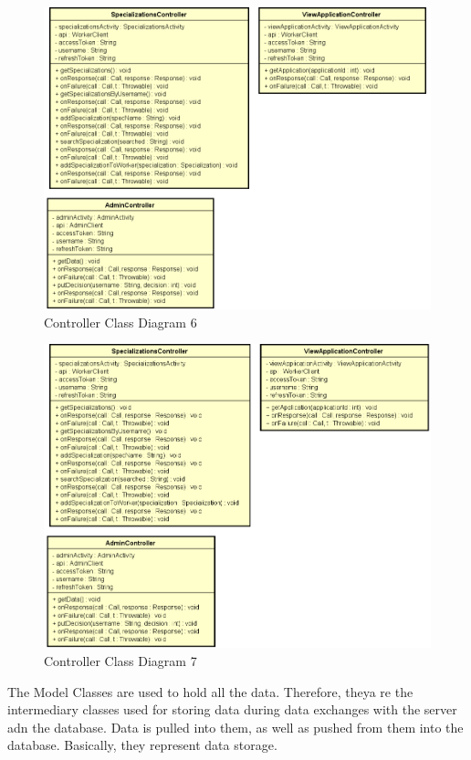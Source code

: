 			\begin{figure}[H]
				\includegraphics[width=\linewidth]{diagrams/Controllers Class Diagram_part6.png}
				\caption{Controller Class Diagram 6}
				\label{fig:controller_class_diag_pt6}
			\end{figure}
		
			\begin{figure}[H]
				\includegraphics[width=\linewidth]{diagrams/Controllers Class Diagram_part7.png}
				\caption{Controller Class Diagram 7}
				\label{fig:controller_class_diag_pt7}
			\end{figure}
		
		The Model Classes are used to hold all the data. Therefore, theya re the intermediary classes used for storing data during data exchanges with the server adn the database. Data is pulled into them, as well as pushed from them into the database. Basically, they represent data storage.
			
